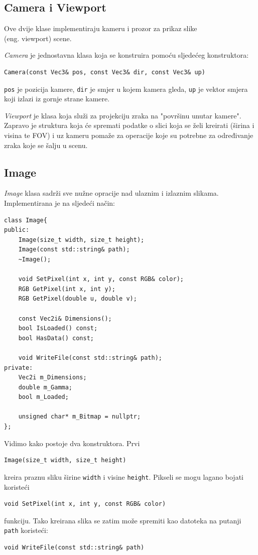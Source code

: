 \documentclass[
12pt, %
oneside, %
english, %
singlespacing, %
parskip, %
headsepline, %
chapterinoneline, %
consistentlayout, %
]{MastersDoctoralThesis} %
\begin{document}
\vspace*{2cm}

\subsection*{Camera i Viewport}
Ove dvije klase implementiraju kameru i prozor za prikaz slike \\ 
(eng. viewport) scene.

\emph{Camera} je jednostavna klasa koja se konstruira pomoću sljedećeg konstruktora:
\begin{verbatim}
Camera(const Vec3& pos, const Vec3& dir, const Vec3& up)
\end{verbatim}
\texttt{pos} je pozicija kamere, \texttt{dir} je smjer u kojem kamera gleda, \texttt{up} je
vektor smjera koji izlazi iz gornje strane kamere. 

\emph{Viewport} je klasa koja služi za projekciju zraka na "površinu unutar kamere". Zapravo je
struktura koja će spremati podatke o slici koja se želi kreirati (širina i visina te FOV) i uz
kameru pomaže za operacije koje su potrebne za određivanje zraka koje se šalju u scenu.

\subsection*{Image}
\emph{Image} klasa sadrži sve nužne opracije nad ulaznim i izlaznim slikama. Implementirana
je na sljedeći način:
\begin{verbatim}
class Image{
public:
	Image(size_t width, size_t height);
	Image(const std::string& path);
	~Image();	

	void SetPixel(int x, int y, const RGB& color);
	RGB GetPixel(int x, int y);
	RGB GetPixel(double u, double v);

	const Vec2i& Dimensions();
	bool IsLoaded() const;
	bool HasData() const;

	void WriteFile(const std::string& path);
private:
	Vec2i m_Dimensions;
	double m_Gamma;
	bool m_Loaded;

	unsigned char* m_Bitmap = nullptr;
};
\end{verbatim}

Vidimo kako postoje dva konstruktora. Prvi
\begin{verbatim}
Image(size_t width, size_t height)
\end{verbatim}
kreira praznu sliku širine \texttt{width} i visine \texttt{height}. Pikseli se mogu lagano
bojati koristeći
\begin{verbatim}
void SetPixel(int x, int y, const RGB& color)
\end{verbatim}
funkciju. Tako kreirana slika se zatim može spremiti kao datoteka na putanji \texttt{path} 
koristeći:
\begin{verbatim}
void WriteFile(const std::string& path)
\end{verbatim}
\end{document}

